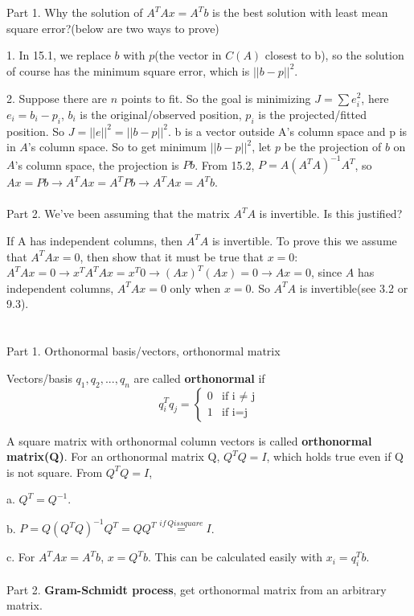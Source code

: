 \documentclass{article}
\begin{document}
\begin{spacing}{1.5}
\section{}
Part 1. Why the solution of $A^TAx=A^Tb$ is the best solution with least mean square error?(below are two ways to prove)

1. In 15.1, we replace $b$ with $p$(the vector in $C(A)$ closest to b), so the solution of course has the minimum square error, which is $||b-p||^2$.

2. Suppose there are $n$ points to fit. So the goal is minimizing $J = \sum e_i^2$, here $e_i = b_i - p_i$, $b_i$ is the original/observed position, $p_i$ is the projected/fitted position. So $J = ||e||^2 = ||b - p||^2$. b is a vector outside A's column space and p is in $A$'s column space. So to get minimum $||b - p||^2$, let $p$ be the projection of $b$ on $A$'s column space, the projection is $Pb$. From 15.2, $P=A(A^TA)^{-1}A^T$, so $Ax=Pb \rightarrow A^TAx=A^TPb \rightarrow A^TAx=A^Tb$. 
\\\\Part 2. We've been assuming that the matrix $A^TA$ is invertible. Is this justified?

If A has independent columns, then $A^TA$ is invertible. To prove this we assume that $A^TAx = 0$, then show that it must be true that $x = 0$:
$A^TAx = 0 \rightarrow x^TA^TAx = x^T0 \rightarrow (Ax)^T(Ax) = 0 \rightarrow Ax = 0$, since $A$ has independent columns, $A^TAx = 0$ only when $x = 0$. So $A^TA$ is invertible(see 3.2 or 9.3).


\section{}
Part 1. Orthonormal basis/vectors, orthonormal matrix

Vectors/basis $q_1, q_2, ..., q_n$ are called {\bfseries orthonormal} if 
$$q_i^Tq_j=
\begin{cases}
0 & \text{if i $\neq$ j}\\
1 & \text{if i=j}
\end{cases}$$

A square matrix with orthonormal column vectors is called {\bfseries orthonormal matrix(Q)}. For an orthonormal matrix Q, $Q^TQ=I$, which holds true even if Q is not square. From $Q^TQ=I$,

a. $Q^T=Q^{-1}$. 

b. $P=Q(Q^TQ)^{-1}Q^T=QQ^T\overset{if \,Q is square}{=}I$.

c. For $A^TAx=A^Tb$, $x=Q^Tb$. This can be calculated easily with $x_i=q_i^Tb$. 
\\\\Part 2. {\bfseries Gram-Schmidt process}, get orthonormal matrix from an arbitrary matrix.


\end{spacing}
\end{document}
